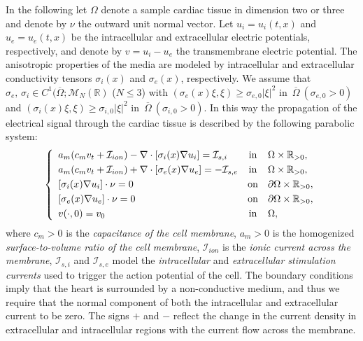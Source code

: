 \documentclass[10pt]{article}
\def\dis{\displaystyle}
\def\Om{\Omega}
\def\\Phivec{\mathbf{\Phi}}
\begin{document}
	In the following let $\Omega$ denote a sample cardiac tissue in dimension two or three and denote
	by $\nu$ the outward unit normal vector. Let $u_i = u_i(t, x)$ and $u_e = u_e(t, x)$ be the intracellular
	and extracellular electric potentials, respectively, and  denote by $v = u_i - u_e$ the transmembrane
	electric potential. The anisotropic properties of the media are modeled by intracellular and extracellular
	conductivity tensors $\sigma_i(x)$ and $\sigma_e(x)$, respectively. We assume that
	$\sigma_e,\,\sigma_i\in C^1(\overline\Om;\mathcal{M}_{N}(\mathbb{R})$
	($N\leq3$) with $(\sigma_e(x)\xi,\xi)\geq \sigma_{e,0}|\xi|^2$
    in~$\overline\Om~(\sigma_{e,0}>0)$ and $(\sigma_i(x)\xi,\xi)\geq \sigma_{i,0}|\xi|^2$
    in~$\overline\Om~(\sigma_{i,0}>0)$. In this way the propagation of the
    electrical signal through the cardiac tissue is described by the following parabolic system:
\begin{equation}\label{eq:bidomain}
    \left\{
        \begin{array}{lcl}
        a_m(c_mv_t+\mathcal{I}_{ion})-\nabla\cdot[\sigma_i(x)\nabla u_i]=\mathcal{I}_{s,i}
        &\mbox{in}&    \Omega \times \mathbb{R}_{>0},         \\
        \noalign{\smallskip}\dis
        a_m(c_mv_t+\mathcal{I}_{ion})+\nabla\cdot[\sigma_e(x)\nabla u_e]=-\mathcal{I}_{s,e}
        &\mbox{in}&    \Omega \times \mathbb{R}_{>0},         \\
        \noalign{\smallskip}\dis
        [\sigma_i(x)\nabla u_i]\cdot \nu = 0
        &\mbox{on}&    \partial \Omega \times \mathbb{R}_{>0},    \\
        \noalign{\smallskip}\dis
        [\sigma_e(x)\nabla u_e]\cdot \nu = 0
        &\mbox{on}&    \partial \Omega \times \mathbb{R}_{>0},    \\
        \noalign{\smallskip}\dis
        v(\cdot,0) =v_0
        &\mbox{in}&    \Omega,
        \end{array}
    \right.
\end{equation}
    where $c_m>0$ is the {\it capacitance of the cell membrane}, $a_m>0$ is the homogenized {\it surface-to-volume ratio of the cell membrane},
    $\mathcal{I}_{ion}$ is the {\it ionic current across the membrane}, $\mathcal{I}_{s,i}$ and $\mathcal{I}_{s,e}$ model the {\it intracellular} and
    {\it extracellular stimulation currents} used to trigger the action potential of the cell.
    The boundary conditions imply that the heart is surrounded by a non-conductive medium, and thus we require
    that the normal component of both the intracellular and extracellular current to be zero.
   The signs $+$ and $-$ reflect the change in the current density in extracellular and intracellular regions with the current flow across the membrane.
\end{document}
